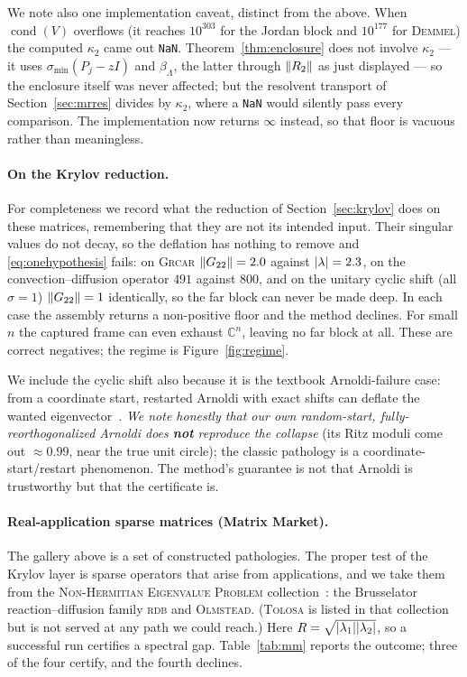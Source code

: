 \documentclass[11pt]{article}
\newcommand{\C}{\mathbb{C}}
\newcommand{\sigmin}{\sigma_{\min}}
\DeclarePairedDelimiter{\norm}{\lVert}{\rVert}
\DeclarePairedDelimiter{\abs}{\lvert}{\rvert}
\begin{document}
We note also one implementation caveat, distinct from the above. When $\operatorname{cond}(V)$
overflows (it reaches $10^{303}$ for the Jordan block and $10^{177}$ for \textsc{Demmel}) the computed
$\kappa_2$ came out \texttt{NaN}. Theorem~\ref{thm:enclosure} does not involve $\kappa_2$ --- it uses
$\sigmin(P_j-zI)$ and $\beta_\Lambda$, the latter through $\norm{R_2}$ as just displayed --- so the
enclosure itself was never affected; but the resolvent transport of Section~\ref{sec:mrres} divides
by $\kappa_2$, where a \texttt{NaN} would silently pass every comparison. The implementation now
returns $\infty$ instead, so that floor is vacuous rather than meaningless.

\paragraph{On the Krylov reduction.} For completeness we record what the reduction of
Section~\ref{sec:krylov} does on these matrices, remembering that they are not its intended input.
Their singular values do not decay, so the deflation has nothing to remove and
\eqref{eq:onehypothesis} fails: on \textsc{Grcar} $\norm{G_{22}}=2.0$ against $\abs{\lambda}=2.3$, on
the convection--diffusion operator $491$ against $800$, and on the unitary cyclic shift (all
$\sigma=1$) $\norm{G_{22}}=1$ identically, so the far block can never be made deep. In each case the
assembly returns a non-positive floor and the method declines. For small $n$ the captured frame can
even exhaust $\C^n$, leaving no far block at all. These are correct negatives; the regime is
Figure~\ref{fig:regime}.

We include the cyclic shift also because it is the textbook Arnoldi-failure case: from a coordinate
start, restarted Arnoldi with exact shifts can deflate the wanted eigenvector~\cite{Embree2009}.
\emph{We note honestly that our own random-start, fully-reorthogonalized Arnoldi does \textbf{not}
reproduce the collapse} (its Ritz moduli come out $\approx0.99$, near the true unit circle); the
classic pathology is a coordinate-start/restart phenomenon. The method's guarantee is not that Arnoldi
is trustworthy but that the certificate is.

\paragraph{Real-application sparse matrices (Matrix Market).} The gallery above is a set of
constructed pathologies. The proper test of the Krylov layer is sparse operators that arise from
applications, and we take them from the \textsc{Non-Hermitian Eigenvalue Problem}
collection~\cite{MatrixMarket}: the Brusselator reaction--diffusion family \textsc{rdb} and
\textsc{Olmstead}. (\textsc{Tolosa} is listed in that collection but is not served at any path we
could reach.) Here $R=\sqrt{\abs{\lambda_1}\abs{\lambda_2}}$, so a successful run certifies a
spectral gap. Table~\ref{tab:mm} reports the outcome; three of the four certify, and the fourth
declines.
\end{document}
